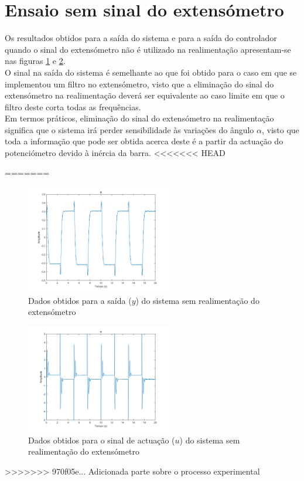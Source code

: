 \documentclass[%
  reprint,
  nofootinbib,
  amsmath,amssymb,
  aps,
  10pt,
  a4paper
]{revtex4-1}
\begin{document}
\section{Ensaio sem sinal do extensómetro}
Os resultados obtidos para a saída do sistema e para a saída do controlador quando o sinal do extensómetro não é utilizado na realimentação apresentam-se nas figuras \ref{fig:y_next} e \ref{fig:u_next}.\\
O sinal na saída do sistema é semelhante ao que foi obtido para o caso em que se implementou um filtro no extensómetro, visto que a eliminação do sinal do extensómetro na realimentação deverá ser equivalente ao caso limite em que o filtro deste corta todas as frequências.\\
Em termos práticos, eliminação do sinal do extensómetro na realimentação significa que o sistema irá perder sensibilidade às variações do ângulo $\alpha$, visto que toda a informação que pode ser obtida acerca deste é a partir da actuação do potenciómetro devido à inércia da barra.
<<<<<<< HEAD

=======
\begin{figure}
\includegraphics[width=2.5in]{../imgs/dados_0n/dados_0n_y.png}
\caption{Dados obtidos para a saída ($y$) do sistema sem realimentação do extensómetro}
\label{fig:y_next}
\end{figure}
\begin{figure}
\includegraphics[width=2.5in]{../imgs/dados_0n/dados_0n_u.png}
\caption{Dados obtidos para o sinal de actuação ($u$) do sistema sem realimentação do extensómetro}
\label{fig:u_next}
\end{figure}
>>>>>>> 970f05e... Adicionada parte sobre o processo experimental
\end{document}
